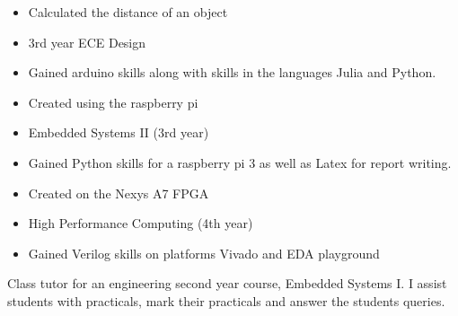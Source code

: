 \documentclass[10pt,a4paper,ragged2e,withhyper]{altacv}
\begin{document}
\begin{paracol}{2}
\newpage
{}


\begin{itemize}
    \item Calculated the distance of an object 
    \item 3rd year ECE Design
    \item Gained arduino skills along with skills in the languages Julia and Python. 
\end{itemize}

\divider

\begin{itemize}
    \item Created using the raspberry pi 
    \item Embedded Systems II (3rd year)
    \item Gained Python skills for a raspberry pi 3 as well as Latex for report writing.
\end{itemize}

\divider

\begin{itemize}
    \item Created on the Nexys A7 FPGA 
    \item High Performance Computing (4th year)
    \item Gained Verilog skills on platforms Vivado and EDA playground
\end{itemize}





Class tutor for an engineering second year course, Embedded Systems I. I assist students with practicals, mark their practicals and answer the students queries.

\divider


\end{paracol}
\end{document}
